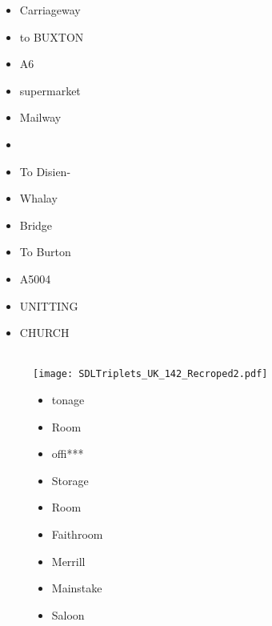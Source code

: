 \documentclass[conference]{IEEEtran}
\begin{document}
\begin{figure*}[th!]
{\begin{minipage}[b]{8cm}
\begin{small}
\begin{itemize}
      \item Carriageway
      \item to BUXTON
      \item A6
      \item supermarket
      \item Mailway
      \item 
      \item To Disien-
      \item Whalay
      \item Bridge
      \item To Burton
      \item A5004
      \item UNITTING
      \item CHURCH
    \end{itemize}
    \end{small}
  \end{minipage}
  }
\end{figure*}

\clearpage

\begin{figure}[th!]
  \\
  \texttt{[image: SDLTriplets\_UK\_142\_Recroped2.pdf]}
  \\
   \label{fig:imgIlus1}
    \begin{small}
    \begin{itemize}
       \item tonage
       \item Room
       \item offi***
       \item Storage
       \item Room
       \item Faithroom
       \item Merrill
       \item Mainstake
       \item Saloon
    \end{itemize}
    \end{small}
\end{figure}



\end{document}
